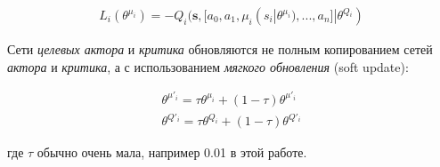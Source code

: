 \begin{equation}
    \begin{multlined}
        L_i(\theta^{\mu_i}) = -Q_i(\mathbf{s}, [a_0, a_1, \mu_i(s_i|\theta^{\mu_i}), ..., a_n]|\theta^{Q_i})
    \end{multlined}
\end{equation}

Сети \textit{целевых актора} и \textit{критика} обновляются не полным копированием сетей \textit{актора} и \textit{критика}, а с использованием \textit{мягкого обновления} (soft update):

\begin{equation}
    \begin{multlined}
        \theta^{\mu'_i} = \tau \theta^{\mu_i} + (1 - \tau)\theta^{\mu'_i}\\
        \theta^{Q'_i} = \tau \theta^{Q_i} + (1 - \tau)\theta^{Q'_i}
    \end{multlined}
\end{equation}

где $\tau$ обычно очень мала, например 0.01 в этой работе.
